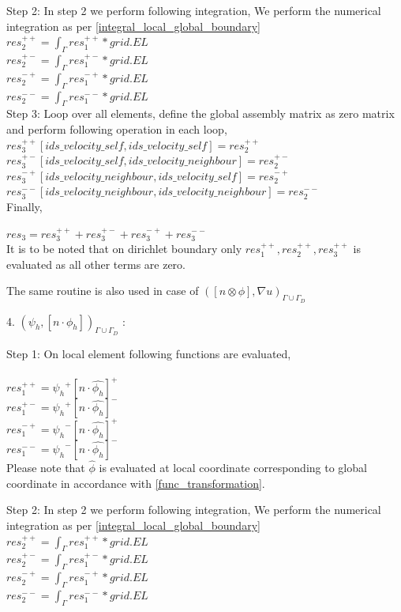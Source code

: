 \documentclass[a4paper,12pt]{book}
\begin{document}
Step 2: In step 2 we perform following integration, 
We perform the numerical integration as per \ref{integral_local_global_boundary}
\\ 
$res_2^{++} = \int_{\Gamma} res_1^{++} * grid.EL$\\
$res_2^{+-} = \int_{\Gamma} res_1^{+-} * grid.EL$\\
$res_2^{-+} = \int_{\Gamma} res_1^{-+} * grid.EL$\\
$res_2^{--} = \int_{\Gamma} res_1^{--} * grid.EL$\\

Step 3: Loop over all elements, define the global assembly matrix as zero matrix and perform following operation in each loop,
\\
$res_3^{++}[ids\_velocity\_self,ids\_velocity\_self] = res_2^{++}$\\
$res_3^{+-}[ids\_velocity\_self,ids\_velocity\_neighbour] = res_2^{+-}$\\
$res_3^{-+}[ids\_velocity\_neighbour,ids\_velocity\_self] = res_2^{-+}$\\
$res_3^{--}[ids\_velocity\_neighbour,ids\_velocity\_neighbour] = res_2^{--}$\\

Finally,

$res_3 = res_3^{++} + res_3^{+-} + res_3^{-+} + res_3^{--}$\\

It is to be noted that on dirichlet boundary only $res_1^{++}, res_2^{++}, res_3^{++}$ is evaluated as all other terms are zero.

The same routine is also used in case of $([n \otimes \phi],{\nabla u})_{\Gamma \cup \Gamma_D}$

4. $({\psi_h}, [n \cdot \phi_h])_{\Gamma \cup \Gamma_D}$ :

Step 1: On local element following functions are evaluated,\\
\\
$res_1^{++} = {\psi_h}^+ [n \cdot \hat{\phi_h}]^+$\\
$res_1^{+-} = {\psi_h}^+ [n \cdot \hat{\phi_h}]^-$\\
$res_1^{-+} = {\psi_h}^- [n \cdot \hat{\phi_h}]^+$\\
$res_1^{--} = {\psi_h}^- [n \cdot \hat{\phi_h}]^-$\\

Please note that $\hat{\phi}$ is evaluated at local coordinate corresponding to global coordinate in accordance with \ref{func_transformation}.

Step 2: In step 2 we perform following integration, 
We perform the numerical integration as per \ref{integral_local_global_boundary}
\\ 
$res_2^{++} = \int_{\Gamma} res_1^{++} * grid.EL$\\
$res_2^{+-} = \int_{\Gamma} res_1^{+-} * grid.EL$\\
$res_2^{-+} = \int_{\Gamma} res_1^{-+} * grid.EL$\\
$res_2^{--} = \int_{\Gamma} res_1^{--} * grid.EL$\\
\end{document}
